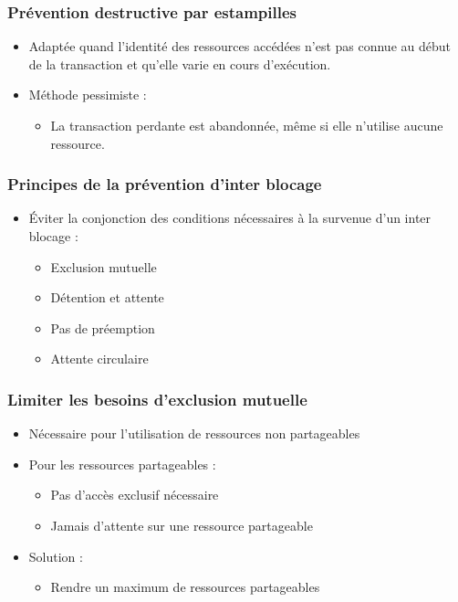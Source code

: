 \begin{frame}
\frametitle{Prévention destructive par estampilles}
\begin{itemize}
\item Adaptée quand l'identité des ressources accédées n'est pas connue au début de la transaction et qu'elle varie en cours d’exécution.
\item Méthode pessimiste :
\begin{itemize}
\item La transaction perdante est abandonnée, même si elle n'utilise aucune ressource.
\end{itemize}
\end{itemize}
\end{frame}

\begin{frame}
\frametitle{Principes de la prévention d’inter blocage}
\begin{itemize}
\item Éviter la conjonction des conditions nécessaires à la survenue d’un inter blocage :
\begin{itemize}
\item Exclusion mutuelle
\item Détention et attente
\item Pas de préemption
\item Attente circulaire
\end{itemize}
\end{itemize}
\end{frame}

\begin{frame}
\frametitle{Limiter les besoins d’exclusion mutuelle}
\begin{itemize}
\item Nécessaire pour l’utilisation de ressources non partageables
\item Pour les ressources partageables :
\begin{itemize}
\item Pas d’accès exclusif nécessaire
\item Jamais d’attente sur une ressource partageable
\end{itemize}
\item Solution :
\begin{itemize}
\item Rendre un maximum de ressources partageables
\end{itemize}
\end{itemize}
\end{frame}

